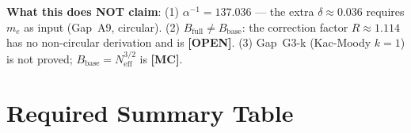 \documentclass[12pt,a4paper]{article}
\theoremstyle{definition}
\theoremstyle{remark}
\begin{document}
\begin{warnbox}
\textbf{What this does NOT claim}:
(1) $\alpha^{-1} = 137.036$ — the extra $\delta \approx 0.036$ requires $m_e$ as
input (Gap~A9, circular).
(2) $B_\mathrm{full} \ne B_\mathrm{base}$: the correction factor $R \approx 1.114$ has no
non-circular derivation and is \textbf{[OPEN]}.
(3) Gap~G3-k (Kac-Moody $k=1$) is not proved; $B_\mathrm{base} = N_\mathrm{eff}^{3/2}$
is \textbf{[MC]}.
\end{warnbox}

\section{Required Summary Table}
\label{sec:g5:table}
\end{document}
